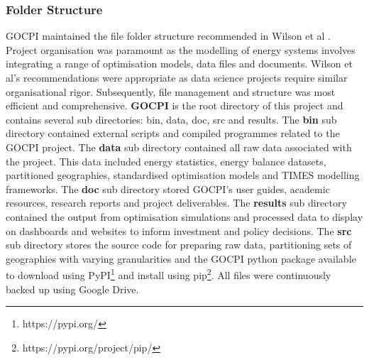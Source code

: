 \documentclass[12pt]{article}
\begin{document}
\subsubsection{Folder Structure}
GOCPI maintained the file folder structure recommended in Wilson et al \cite{J:10}. 
Project organisation was paramount as the modelling of energy systems involves integrating a range of optimisation models, data files and documents. 
Wilson et al's recommendations were appropriate as data science projects require similar organisational rigor. 
Subsequently, file management and structure was most efficient and comprehensive. \textbf{GOCPI} is the root directory of this project and contains several sub directories: bin, data, doc, src and results.  
The \textbf{bin} sub directory contained external scripts and compiled programmes related to the GOCPI project. 
The \textbf{data} sub directory contained all raw data associated with the project. 
This data included energy statistics, energy balance datasets, partitioned geographies, standardised optimisation models and TIMES modelling frameworks.
The \textbf{doc} sub directory stored GOCPI's user guides, academic resources, research reports and project deliverables.
The \textbf{results} sub directory contained the output from optimisation simulations and processed data to display on dashboards and websites to inform investment and policy decisions.
The \textbf{src} sub directory stores the source code for preparing raw data, partitioning sets of geographies with varying granularities and the GOCPI python package available to download using PyPI\footnote[2]{https://pypi.org/} and install using pip\footnote[3]{https://pypi.org/project/pip/}.
All files were continuously backed up using Google Drive.
\end{document}
